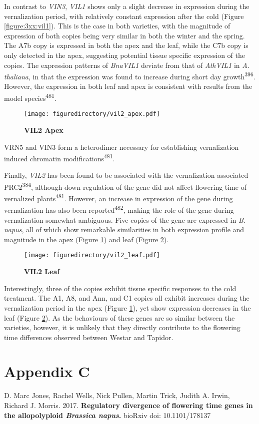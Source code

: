 \documentclass[12pt,]{book}
\begin{document}
In contrast to \emph{VIN3}, \emph{VIL1} shows only a slight decrease in
expression during the vernalization period, with relatively constant
expression after the cold (Figure \ref{figure:3xx:vil1}). This is the
case in both varieties, with the magnitude of expression of both copies
being very similar in both the winter and the spring. The A7b copy is
expressed in both the apex and the leaf, while the C7b copy is only
detected in the apex, suggesting potential tissue specific expression of
the copies. The expression patterns of \emph{BnaVIL1} deviate from that
of \emph{AthVIL1} in \emph{A. thaliana}, in that the expression was
found to increase during short day growth\textsuperscript{396}. However,
the expression in both leaf and apex is consistent with results from the
model species\textsuperscript{481}.

\begin{figure}[htbp]
\centering
\texttt{[image: figuredirectory/vil2\_apex.pdf]}
\caption{\textbf{VIL2 Apex}}\label{figure:3xx:vil2apex}
\end{figure}

VRN5 and VIN3 form a heterodimer necessary for establishing
vernalization induced chromatin modifications\textsuperscript{481}.

Finally, \emph{VIL2} has been found to be associated with the
vernalization associated PRC2\textsuperscript{384}, although down
regulation of the gene did not affect flowering time of vernalized
plants\textsuperscript{481}. However, an increase in expression of the
gene during vernalization has also been reported\textsuperscript{482},
making the role of the gene during vernalization somewhat ambiguous.
Five copies of the gene are expressed in \emph{B. napus}, all of which
show remarkable similarities in both expression profile and magnitude in
the apex (Figure \ref{figure:3xx:vil2apex}) and leaf (Figure
\ref{figure:3xx:vil2leaf}).

\begin{figure}[htbp]
\centering
\texttt{[image: figuredirectory/vil2\_leaf.pdf]}
\caption{\textbf{VIL2 Leaf}}\label{figure:3xx:vil2leaf}
\end{figure}

Interestingly, three of the copies exhibit tissue specific responses to
the cold treatment. The A1, A8, and Ann, and C1 copies all exhibit
increases during the vernalization period in the apex (Figure
\ref{figure:3xx:vil2apex}), yet show expression decreases in the leaf
(Figure \ref{figure:3xx:vil2leaf}). As the behaviours of these genes are
so similar between the varieties, however, it is unlikely that they
directly contribute to the flowering time differences observed between
Westar and Tapidor.

\chapter*{Appendix C}\label{chapter:appendixc}

D. Marc Jones, Rachel Wells, Nick Pullen, Martin Trick, Judith A. Irwin,
Richard J. Morris. 2017. \textbf{Regulatory divergence of flowering time
genes in the allopolyploid \emph{Brassica napus}.} bioRxiv doi:
10.1101/178137
\end{document}
